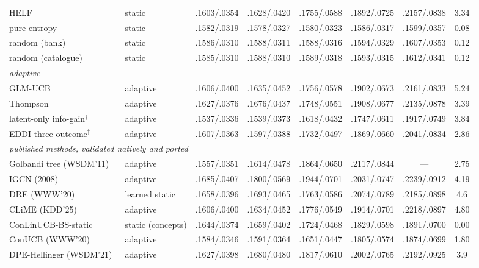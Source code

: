 \documentclass[11pt]{article}
\begin{document}
\begin{table}[t]
{\begin{tabular}{llccccc c}
HELF~\cite{rashid2008learning} & static & .1603/.0354 & .1628/.0420 & .1755/.0588 & .1892/.0725 & .2157/.0838 & 3.34 \\
pure entropy~\cite{rashid2002getting} & static & .1582/.0319 & .1578/.0327 & .1580/.0323 & .1586/.0317 & .1599/.0357 & 0.08 \\
random (bank) & static & .1586/.0310 & .1588/.0311 & .1588/.0316 & .1594/.0329 & .1607/.0353 & 0.12 \\
random (catalogue) & static & .1585/.0310 & .1588/.0310 & .1589/.0318 & .1593/.0315 & .1612/.0341 & 0.12 \\
\midrule
\multicolumn{8}{l}{\emph{adaptive}}\\
GLM-UCB~\cite{zhao2013interactive} & adaptive & .1606/.0400 & .1635/.0452 & .1756/.0578 & .1902/.0673 & .2161/.0833 & 5.24 \\
Thompson~\cite{zhao2013interactive} & adaptive & .1627/.0376 & .1676/.0437 & .1748/.0551 & .1908/.0677 & .2135/.0878 & 3.39 \\
latent-only info-gain$^\dagger$~\cite{ma2019eddi} & adaptive & .1537/.0336 & .1539/.0373 & .1618/.0432 & .1747/.0611 & .1917/.0749 & 3.84 \\
EDDI three-outcome$^\ddagger$~\cite{ma2019eddi} & adaptive & .1607/.0363 & .1597/.0388 & .1732/.0497 & .1869/.0660 & .2041/.0834 & 2.86 \\
\midrule
\multicolumn{8}{l}{\emph{published methods, validated natively and ported}}\\
Golbandi tree (WSDM'11)~\cite{golbandi2011adaptive} & adaptive & .1557/.0351 & .1614/.0478 & .1864/.0650 & .2117/.0844 & --- & 2.75 \\
IGCN (2008)~\cite{rashid2008learning} & adaptive & .1685/.0407 & .1800/.0569 & .1944/.0701 & .2031/.0747 & .2239/.0912 & 4.19 \\
DRE (WWW'20)~\cite{kweon2020deep} & learned static & .1658/.0396 & .1693/.0465 & .1763/.0586 & .2074/.0789 & .2185/.0898 & 4.6 \\
CLiME (KDD'25)~\cite{liu2025clisk} & adaptive & .1606/.0400 & .1634/.0452 & .1776/.0549 & .1914/.0701 & .2218/.0897 & 4.80 \\
ConLinUCB-BS-static~\cite{wang2023conlinucb} & static (concepts) & .1644/.0374 & .1659/.0402 & .1724/.0468 & .1829/.0598 & .1891/.0700 & 0.00 \\
ConUCB (WWW'20)~\cite{zhang2020conucb} & adaptive & .1584/.0346 & .1591/.0364 & .1651/.0447 & .1805/.0574 & .1874/.0699 & 1.80 \\
DPE-Hellinger (WSDM'21)~\cite{parapar2021dpe} & adaptive & .1627/.0398 & .1680/.0480 & .1817/.0610 & .2002/.0765 & .2192/.0925 & 3.9 \\

\end{tabular}}
\end{table}
\end{document}

